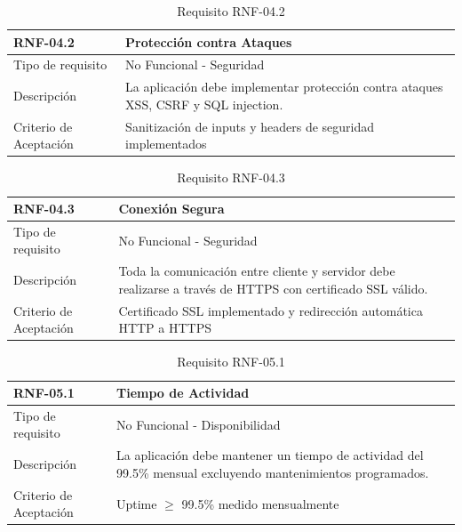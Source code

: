 \begin{table}[H]
\centering
\begin{tabular}{|p{3cm}|p{10cm}|}
\hline
\rowcolor{tealblue}
{\textbf{RNF-04.2}} & {\textbf{Protección contra Ataques}} \\
\hline
Tipo de requisito & No Funcional - Seguridad \\
\hline
Descripción & La aplicación debe implementar protección contra ataques XSS, CSRF y SQL injection. \\
\hline
Criterio de Aceptación & Sanitización de inputs y headers de seguridad implementados \\
\hline
\end{tabular}
\caption{Requisito RNF-04.2}
\end{table}

\begin{table}[H]
\centering
\begin{tabular}{|p{3cm}|p{10cm}|}
\hline
\rowcolor{tealblue}
{\textbf{RNF-04.3}} & {\textbf{Conexión Segura}} \\
\hline
Tipo de requisito & No Funcional - Seguridad \\
\hline
Descripción & Toda la comunicación entre cliente y servidor debe realizarse a través de HTTPS con certificado SSL válido. \\
\hline
Criterio de Aceptación & Certificado SSL implementado y redirección automática HTTP a HTTPS \\
\hline
\end{tabular}
\caption{Requisito RNF-04.3}
\end{table}


\begin{table}[H]
\centering
\begin{tabular}{|p{3cm}|p{10cm}|}
\hline
\rowcolor{tealblue}
{\textbf{RNF-05.1}} & {\textbf{Tiempo de Actividad}} \\
\hline
Tipo de requisito & No Funcional - Disponibilidad \\
\hline
Descripción & La aplicación debe mantener un tiempo de actividad del 99.5\% mensual excluyendo mantenimientos programados. \\
\hline
Criterio de Aceptación & Uptime $\geq$ 99.5\% medido mensualmente \\
\hline
\end{tabular}
\caption{Requisito RNF-05.1}
\end{table}

